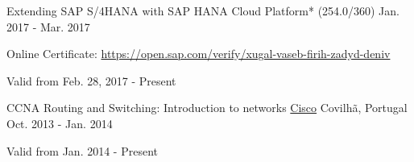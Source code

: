 \begin{cventries}
{    }        
    \vspace{-0.1cm}
  \cventry
    {Extending SAP S/4HANA with SAP HANA Cloud Platform* (254.0/360)} %
    {} %
    {} %
    {Jan. 2017 - Mar. 2017} %
    {
	    \begin{cvitems} %
        \item[] {Online Certificate: \url{https://open.sap.com/verify/xugal-vaseb-firih-zadyd-deniv}} %
        \item[] {Valid from Feb. 28, 2017 - Present} %
      \end{cvitems}
    }
  \cventry
    {CCNA Routing and Switching: Introduction to networks} %
    {\href{https://www.cisco.com/}{Cisco}} %
    {Covilh\~a, Portugal} %
    {Oct. 2013 - Jan. 2014} %
    {
	    \begin{cvitems} %
        \item[] {Valid from Jan. 2014 - Present} %
      \end{cvitems}
    }

\end{cventries}